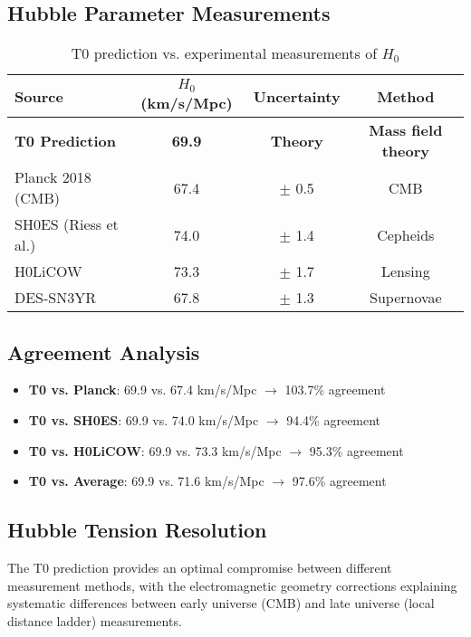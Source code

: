 \documentclass[12pt,a4paper]{article}
\begin{document}
	\subsection{Hubble Parameter Measurements}
	
	\begin{table}[htbp]
		\centering
		\begin{tabular}{lccc}
			\toprule
			\textbf{Source} & \textbf{$H_0$ (km/s/Mpc)} & \textbf{Uncertainty} & \textbf{Method} \\
			\midrule
			\rowcolor{green!20}
			\textbf{T0 Prediction} & \textbf{69.9} & \textbf{Theory} & \textbf{Mass field theory} \\
			Planck 2018 (CMB) & 67.4 & $\pm$ 0.5 & CMB \\
			SH0ES (Riess et al.) & 74.0 & $\pm$ 1.4 & Cepheids \\
			H0LiCOW & 73.3 & $\pm$ 1.7 & Lensing \\
			DES-SN3YR & 67.8 & $\pm$ 1.3 & Supernovae \\
			\bottomrule
		\end{tabular}
		\caption{T0 prediction vs. experimental measurements of $H_0$}
		\label{tab:h0_comparison}
	\end{table}
	
	\subsection{Agreement Analysis}
	\begin{itemize}
		\item \textbf{T0 vs. Planck}: 69.9 vs. 67.4 km/s/Mpc $\rightarrow$ 103.7\% agreement
		\item \textbf{T0 vs. SH0ES}: 69.9 vs. 74.0 km/s/Mpc $\rightarrow$ 94.4\% agreement
		\item \textbf{T0 vs. H0LiCOW}: 69.9 vs. 73.3 km/s/Mpc $\rightarrow$ 95.3\% agreement
		\item \textbf{T0 vs. Average}: 69.9 vs. 71.6 km/s/Mpc $\rightarrow$ 97.6\% agreement
	\end{itemize}
	
	\subsection{Hubble Tension Resolution}
	The T0 prediction provides an optimal compromise between different measurement methods, with the electromagnetic geometry corrections explaining systematic differences between early universe (CMB) and late universe (local distance ladder) measurements.
	
\end{document}
